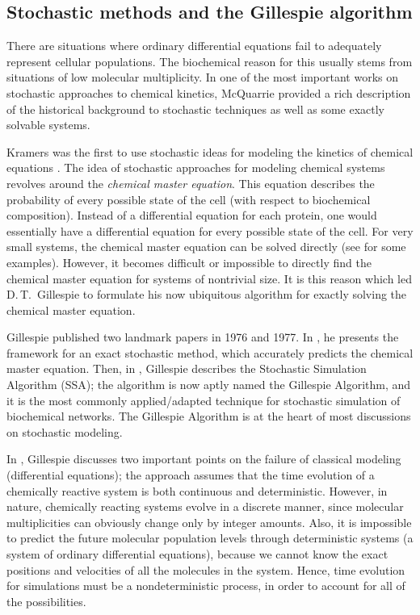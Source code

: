 \documentclass[copyright]{eptcs}
\begin{document}
\subsection{Stochastic methods and the Gillespie algorithm}

There are situations where ordinary differential equations fail to adequately represent cellular populations.  The biochemical reason for this usually stems from situations of low molecular multiplicity.  In one of the most important works on stochastic approaches to chemical kinetics, McQuarrie \cite{mcquarrie67} provided a rich description of the historical background to stochastic techniques as well as some exactly solvable systems.

Kramers was the first to use stochastic ideas for modeling the kinetics of chemical equations \cite{kramers40,montroll58}.  The idea of stochastic approaches for modeling chemical systems revolves around the \emph{chemical master equation}.  This equation describes the probability of every possible state of the cell (with respect to biochemical composition).  Instead of a differential equation for each protein, one would essentially have a differential equation for every possible state of the cell.
For very small systems, the chemical master equation can be solved directly (see \cite{mcquarrie67} for some examples).  However, it becomes difficult or impossible to directly find the chemical master equation for systems of nontrivial size.  It is this reason which led D.\,T.~Gillespie to formulate his now ubiquitous algorithm for exactly solving the chemical master equation.

Gillespie published two landmark papers in 1976 and 1977.  In \cite{gillesp76}, he presents the framework for an exact stochastic method, which accurately predicts the chemical master equation.  Then, in \cite{gillesp77}, Gillespie describes the Stochastic Simulation Algorithm (SSA); the algorithm is now aptly named the Gillespie Algorithm, and it is the most commonly applied/adapted technique for stochastic simulation of biochemical networks.  The Gillespie Algorithm is at the heart of most discussions on stochastic modeling.

In \cite{gillesp77}, Gillespie discusses two important points on the failure of classical modeling (differential equations); the approach assumes that the time evolution of a chemically reactive system is both continuous and deterministic.  However, in nature, chemically reacting systems evolve in a discrete manner, since molecular multiplicities can obviously change only by integer amounts.  Also, it is impossible to predict the future molecular population levels through deterministic systems (a system of ordinary differential equations), because we cannot know the exact positions and velocities of all the molecules in the system.  Hence, time evolution for simulations must be a nondeterministic process, in order to account for all of the possibilities.
\end{document}

